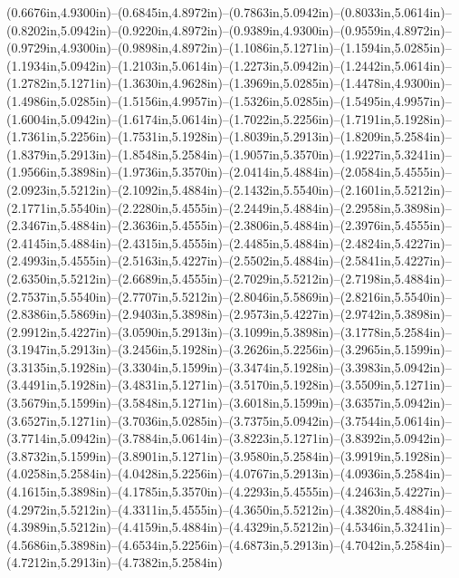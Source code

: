 (0.6676in,4.9300in)--(0.6845in,4.8972in)--(0.7863in,5.0942in)--(0.8033in,5.0614in)--(0.8202in,5.0942in)--(0.9220in,4.8972in)--(0.9389in,4.9300in)--(0.9559in,4.8972in)--(0.9729in,4.9300in)--(0.9898in,4.8972in)--(1.1086in,5.1271in)--(1.1594in,5.0285in)--(1.1934in,5.0942in)--(1.2103in,5.0614in)--(1.2273in,5.0942in)--(1.2442in,5.0614in)--(1.2782in,5.1271in)--(1.3630in,4.9628in)--(1.3969in,5.0285in)--(1.4478in,4.9300in)--(1.4986in,5.0285in)--(1.5156in,4.9957in)--(1.5326in,5.0285in)--(1.5495in,4.9957in)--(1.6004in,5.0942in)--(1.6174in,5.0614in)--(1.7022in,5.2256in)--(1.7191in,5.1928in)--(1.7361in,5.2256in)--(1.7531in,5.1928in)--(1.8039in,5.2913in)--(1.8209in,5.2584in)--(1.8379in,5.2913in)--(1.8548in,5.2584in)--(1.9057in,5.3570in)--(1.9227in,5.3241in)--(1.9566in,5.3898in)--(1.9736in,5.3570in)--(2.0414in,5.4884in)--(2.0584in,5.4555in)--(2.0923in,5.5212in)--(2.1092in,5.4884in)--(2.1432in,5.5540in)--(2.1601in,5.5212in)--(2.1771in,5.5540in)--(2.2280in,5.4555in)--(2.2449in,5.4884in)--(2.2958in,5.3898in)--(2.3467in,5.4884in)--(2.3636in,5.4555in)--(2.3806in,5.4884in)--(2.3976in,5.4555in)--(2.4145in,5.4884in)--(2.4315in,5.4555in)--(2.4485in,5.4884in)--(2.4824in,5.4227in)--(2.4993in,5.4555in)--(2.5163in,5.4227in)--(2.5502in,5.4884in)--(2.5841in,5.4227in)--(2.6350in,5.5212in)--(2.6689in,5.4555in)--(2.7029in,5.5212in)--(2.7198in,5.4884in)--(2.7537in,5.5540in)--(2.7707in,5.5212in)--(2.8046in,5.5869in)--(2.8216in,5.5540in)--(2.8386in,5.5869in)--(2.9403in,5.3898in)--(2.9573in,5.4227in)--(2.9742in,5.3898in)--(2.9912in,5.4227in)--(3.0590in,5.2913in)--(3.1099in,5.3898in)--(3.1778in,5.2584in)--(3.1947in,5.2913in)--(3.2456in,5.1928in)--(3.2626in,5.2256in)--(3.2965in,5.1599in)--(3.3135in,5.1928in)--(3.3304in,5.1599in)--(3.3474in,5.1928in)--(3.3983in,5.0942in)--(3.4491in,5.1928in)--(3.4831in,5.1271in)--(3.5170in,5.1928in)--(3.5509in,5.1271in)--(3.5679in,5.1599in)--(3.5848in,5.1271in)--(3.6018in,5.1599in)--(3.6357in,5.0942in)--(3.6527in,5.1271in)--(3.7036in,5.0285in)--(3.7375in,5.0942in)--(3.7544in,5.0614in)--(3.7714in,5.0942in)--(3.7884in,5.0614in)--(3.8223in,5.1271in)--(3.8392in,5.0942in)--(3.8732in,5.1599in)--(3.8901in,5.1271in)--(3.9580in,5.2584in)--(3.9919in,5.1928in)--(4.0258in,5.2584in)--(4.0428in,5.2256in)--(4.0767in,5.2913in)--(4.0936in,5.2584in)--(4.1615in,5.3898in)--(4.1785in,5.3570in)--(4.2293in,5.4555in)--(4.2463in,5.4227in)--(4.2972in,5.5212in)--(4.3311in,5.4555in)--(4.3650in,5.5212in)--(4.3820in,5.4884in)--(4.3989in,5.5212in)--(4.4159in,5.4884in)--(4.4329in,5.5212in)--(4.5346in,5.3241in)--(4.5686in,5.3898in)--(4.6534in,5.2256in)--(4.6873in,5.2913in)--(4.7042in,5.2584in)--(4.7212in,5.2913in)--(4.7382in,5.2584in) 